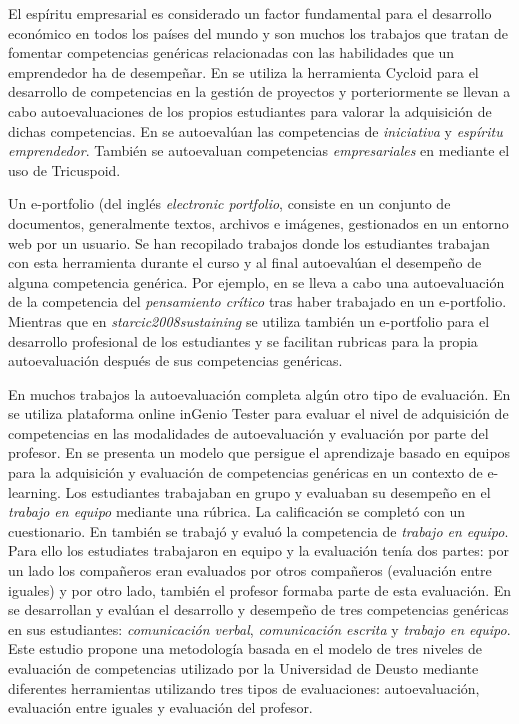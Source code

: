 El espíritu empresarial es considerado un factor fundamental para el desarrollo económico en todos los países del mundo \cite{DeXena2012educacion} y son muchos los trabajos que tratan de fomentar competencias genéricas relacionadas con las habilidades que un emprendedor ha de desempeñar. En \cite{chang2009international} se utiliza la herramienta Cycloid para el desarrollo de competencias en la gestión de proyectos y porteriormente se llevan a cabo autoevaluaciones de los propios estudiantes para valorar la adquisición de dichas competencias. En \cite{marquez2010have} se autoevalúan las competencias de \emph{iniciativa} y \emph{espíritu emprendedor}. También se autoevaluan competencias \emph{empresariales} en  \cite{achcaoucaou2014competence} mediante el uso de Tricuspoid. 

Un e-portfolio (del inglés \emph{electronic portfolio}, consiste en un conjunto de documentos, generalmente textos, archivos e imágenes, gestionados en un entorno web por un usuario. Se han recopilado trabajos donde los estudiantes trabajan con esta herramienta durante el curso y al final autoevalúan el desempeño de alguna competencia genérica. Por ejemplo, en \cite{arno2011promoting} se lleva a cabo una autoevaluación de la competencia del \emph{pensamiento crítico} tras haber trabajado en un e-portfolio. Mientras que en \emph{starcic2008sustaining} se utiliza también un e-portfolio para el desarrollo profesional de los estudiantes y se facilitan rubricas para la propia autoevaluación después de sus competencias genéricas.

En muchos trabajos la autoevaluación completa algún otro tipo de evaluación. En \cite{sevilla2012assessment} se utiliza plataforma online inGenio Tester para evaluar el nivel de adquisición de competencias en las modalidades de autoevaluación y evaluación por parte del profesor. En \cite{ficapal2015learning} se presenta un modelo que persigue el aprendizaje basado en equipos para la adquisición y evaluación de competencias genéricas en un contexto de e-learning. Los estudiantes trabajaban en grupo y evaluaban su desempeño en el \emph{trabajo en equipo} mediante una rúbrica. La calificación se completó con un cuestionario. En \cite{khamis2012measurement} también se trabajó y evaluó la competencia de \emph{trabajo en equipo}. Para ello los estudiates trabajaron en equipo y la evaluación tenía dos partes: por un lado los compañeros eran evaluados por otros compañeros (evaluación entre iguales) y por otro lado, también el profesor formaba parte de esta evaluación. En \cite{barbera2011assessment} se desarrollan y evalúan el desarrollo y desempeño de tres competencias genéricas en sus estudiantes: \emph{comunicación verbal}, \emph{comunicación escrita} y \emph{trabajo en equipo}. Este estudio propone una metodología basada en el modelo de tres niveles de evaluación de competencias utilizado por la Universidad de Deusto mediante diferentes herramientas utilizando tres tipos de evaluaciones: autoevaluación, evaluación entre iguales y evaluación del profesor.

